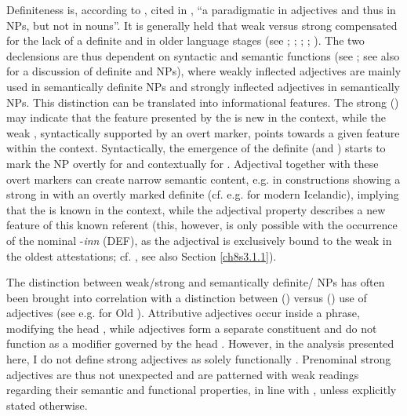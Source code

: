 \documentclass[output=paper,colorlinks,citecolor=brown]{langscibook}
\begin{document}
Definiteness is, according to \citet[14]{Heltoft10}, cited in \citet[e15]{Borjarsetal16}, ``a paradigmatic  in adjectives and thus in NPs, but
not in nouns''. It is generally held that weak versus strong 
compensated for the lack of a definite and   in older
language stages (see \citealp[vol I, 51]{Mitchell85}; \citealp[171ff]{Traugott1992}; \citealp[159ff]{Fischer00}; \citealp[249ff]{Fischer01}; \citealp[256ff]{Fischer06}). The two declensions are thus
dependent on syntactic and semantic functions (see \citealp[37]{Faarlund04};
see also \citealp[122ff]{Abbott2008} for a discussion of definite and 
NPs), where weakly inflected adjectives are mainly used in semantically
definite NPs and strongly inflected adjectives in semantically
 NPs. This distinction can be translated into informational
features. The strong ()  may indicate
that the feature presented by the  is new in the context, while
the weak , syntactically supported by an overt
 marker, points towards a given feature within the context.
Syntactically, the emergence of the definite (and ) 
starts to mark the NP overtly for  and contextually for
. Adjectival  together with these overt markers can
create narrow semantic content, e.g. in constructions showing a strong
 in  with an overtly marked definite  (cf. e.g.
\citealp[3]{Thráinsson2007} for modern Icelandic), implying that the  is
known in the context, while the adjectival property describes a new
feature of this known referent (this, however, is only possible with the
occurrence of the nominal  -\emph{inn} (DEF), as the adjectival
 is exclusively bound to the weak  in the oldest
attestations; cf. \citealp{Pfaff2019}, see also Section \ref{ch8s3.1.1}).

\largerpage
The distinction between weak/strong  and semantically
definite/ NPs has often been brought into correlation with a
distinction between ()  versus () 
use of adjectives (see e.g. \citealp[256]{Fischer12} for Old ).
Attributive adjectives occur inside a  phrase, modifying the head
, while  adjectives form a separate constituent and do
not function as a modifier governed by the head . However, in the
analysis presented here, I do not define strong adjectives as solely
functionally . Prenominal strong adjectives are thus not
unexpected and are patterned with  weak  readings
regarding their semantic and functional properties, in line with \citet[66ff]{Haumann10}, unless explicitly stated otherwise.
\end{document}
